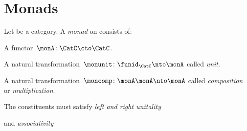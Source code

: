

\section{Monads}

\begin{ctdefinition}[Monad]
  Let \CatC be a category. A \emph{monad} on \CatC consists of:
  \begin{compactenum}
    \item A functor~$ \monA \colon \CatC \cto \CatC$.
    \item A natural transformation~$\monunit \colon \funid_\CatC \nto \monA$ called \emph{unit}.
    \item A natural transformation~$\moncomp \colon \monA \monA \nto \monA$ called \emph{composition} or \emph{multiplication}.
  \end{compactenum}
  The constituents must satisfy \emph{left and right unitality}
  \begin{center}
  \end{center}
  and \emph{associativity}
  \begin{center}
  \end{center}
\end{ctdefinition}
